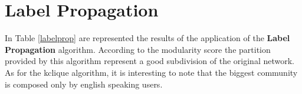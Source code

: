     \begin{table}[H]
        \centering
        \begin{subtable}{\textwidth}
        \end{subtable}
        \caption{Evaluation of the partitions obtained by the application of the K-Clique algorithm.}
        \label{kclique}
    \end{table}


\section{Label Propagation} %
\label{sec:label_propagation}
    In Table \ref{labelprop} are represented the results of the application of the \textbf{Label Propagation}
    algorithm. According to the modularity score the partition provided by this algorithm represent a good
    subdivision of the original network. As for the kclique algorithm, it is interesting to note that the biggest
    community is composed only by english speaking users.

